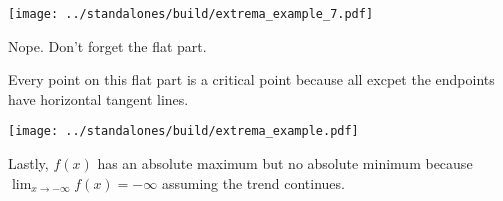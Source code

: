 \documentclass[12pt, handout]{beamer}
\begin{document}
\begin{frame}[t]
  \texttt{[image: ../standalones/build/extrema\_example\_7.pdf]}
  
  Nope. Don't forget the flat part. 

  Every point on this flat part is a critical point because all excpet the endpoints have horizontal tangent lines.
\end{frame}


\begin{frame}[t]
  \texttt{[image: ../standalones/build/extrema\_example.pdf]}

  Lastly, \(f(x)\) has an absolute maximum but no absolute minimum because \(\lim_{x \to -\infty} f(x) = -\infty\) assuming the trend continues.
\end{frame}
\end{document}
